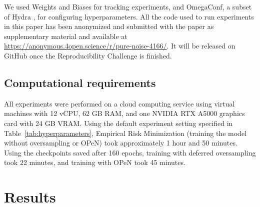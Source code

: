We used Weights and Biases \citep{pip__wandb} for tracking experiments, and OmegaConf, a subset of Hydra \citep{pip__hydra}, for configuring hyperparameters. All the code used to run experiments in this paper has been anonymized and submitted with the paper as supplementary material and available at \url{https://anonymous.4open.science/r/pure-noise-4166/}. It will be released on GitHub once the Reproducibility Challenge is finished.



\subsection{Computational requirements}

All experiments were performed on a cloud computing service using virtual machines with 12 vCPU, 62 GB RAM, and one NVIDIA RTX A5000 graphics card with 24 GB VRAM. Using the default experiment setting specified in Table~\ref{tab:hyperparameters}, Empirical Risk Minimization (training the model without oversampling or OPeN) took approximately 1 hour and 50 minutes. Using the checkpoints saved after 160 epochs, training with deferred oversampling took 22 minutes, and training with OPeN took 45 minutes.




\section{Results}
\label{sec:results}



